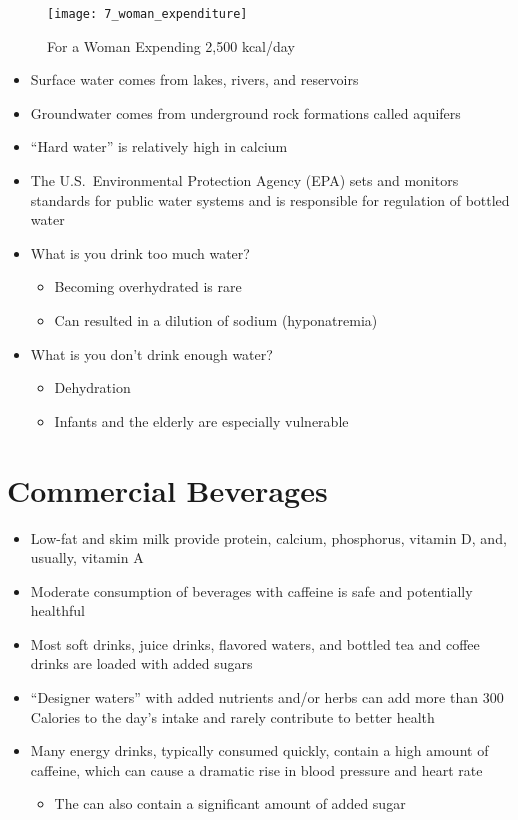 \documentclass[title={Chapter 7}]{fdsn201notes}
\begin{document}
\begin{figure}[H]
	\centering
	\texttt{[image: 7\_woman\_expenditure]}
	\caption{For a Woman Expending 2,500 kcal/day}
	\label{fig:woman_expenditure}
\end{figure}

\begin{itemize}
	\item Surface water comes from lakes, rivers, and reservoirs
	\item Groundwater comes from underground rock formations called aquifers
	\item ``Hard water'' is relatively high in calcium
	\item The U.S.\ Environmental Protection Agency (EPA) sets and monitors standards for public water systems and is responsible for regulation of bottled water
	\item What is you drink too much water?
	\begin{itemize}
		\item Becoming overhydrated is rare
		\item Can resulted in a dilution of sodium (hyponatremia)
	\end{itemize}
	\item What is you don't drink enough water?
	\begin{itemize}
		\item Dehydration
		\item Infants and the elderly are especially vulnerable
	\end{itemize}
\end{itemize}

\section{Commercial Beverages}\label{sec:commercial-beverages}
\begin{itemize}
	\item Low-fat and skim milk provide protein, calcium, phosphorus, vitamin D, and, usually, vitamin A
	\item Moderate consumption of beverages with caffeine is safe and potentially healthful
	\item Most soft drinks, juice drinks, flavored waters, and bottled tea and coffee drinks are loaded with added sugars
	\item ``Designer waters'' with added nutrients and/or herbs can add more than 300 Calories to the day's intake and rarely contribute to better health
	\item Many energy drinks, typically consumed quickly, contain a high amount of caffeine, which can cause a dramatic rise in blood pressure and heart rate
	\begin{itemize}
		\item The can also contain a significant amount of added sugar
	\end{itemize}
\end{itemize}
\end{document}
